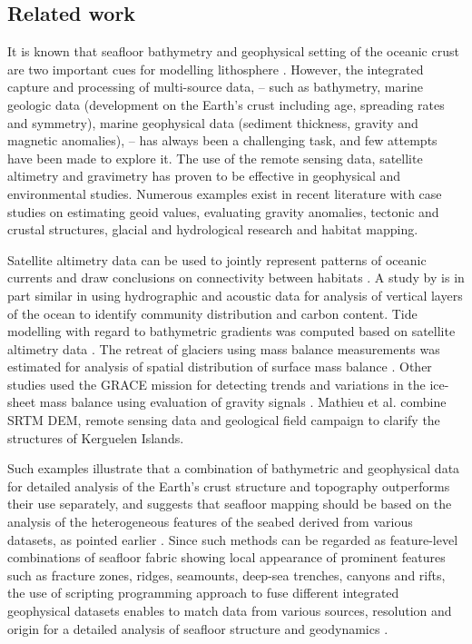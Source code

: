 \documentclass[geomatics,article,submit,pdftex,moreauthors]{Definitions/mdpi}
\begin{document}
\subsection{Related work}

It is known that seafloor bathymetry and geophysical setting of the oceanic crust are two important cues for modelling lithosphere \cite{WATSON201697}. However, the integrated capture and processing of multi-source data, -- such as bathymetry, marine geologic data (development on the Earth's crust including age, spreading rates and symmetry), marine geophysical data (sediment thickness, gravity and magnetic anomalies), -- has always been a challenging task, and few attempts have been made to explore it. The use of the remote sensing data, satellite altimetry and gravimetry has proven to be effective in geophysical and environmental studies. Numerous examples exist in recent literature with case studies on estimating geoid values, evaluating gravity anomalies, tectonic and crustal structures, glacial and hydrological research and habitat mapping. 

Satellite altimetry data can be used to jointly represent patterns of oceanic currents and draw conclusions on connectivity between habitats \cite{MORI201645}. A study by \cite{COTTE2022103650} is in part similar in using hydrographic and acoustic data for analysis of vertical layers of the ocean to identify community distribution and carbon content. Tide modelling with regard to bathymetric gradients was computed based on satellite altimetry data \cite{Maraldi}. The retreat of glaciers using mass balance measurements was estimated for analysis of spatial distribution of surface mass balance \cite{Verfaillie}. Other studies used the GRACE mission for detecting trends and variations in the ice-sheet mass balance using evaluation of gravity signals \cite{YAMAMOTO2008267}. Mathieu et al. \cite{MATHIEU2011206} combine SRTM DEM, remote sensing data and geological field campaign to clarify the structures of Kerguelen Islands. 

Such examples illustrate that a combination of bathymetric and geophysical data for detailed analysis of the Earth's crust structure and topography outperforms their use separately, and suggests that seafloor mapping should be based on the analysis of the heterogeneous features of the seabed derived from various datasets, as pointed earlier \cite{COWLEY2004267,Lemenkova202125,1993A234,ABUAMARAH2019868}. Since such methods can be regarded as feature-level combinations of seafloor fabric showing local appearance of prominent features such as fracture zones, ridges, seamounts, deep-sea trenches, canyons and rifts, the use of scripting programming approach to fuse different integrated geophysical datasets enables to match data from various sources, resolution and origin for a detailed analysis of seafloor structure and geodynamics \cite{Veevers1991b,Lemenkova202104,Hill}. 
\end{document}
